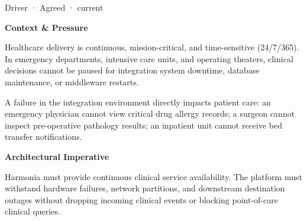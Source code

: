 \label{element:80e2d5f142da4dae8b7bb70e9ddcab06}
{\small Driver · Agreed · current}\par

\par\medskip\textbf{Context \& Pressure}\par


Healthcare delivery is continuous, mission-critical, and time-sensitive (24/7/365). In emergency departments, intensive care units, and operating theaters, clinical decisions cannot be paused for integration system downtime, database maintenance, or middleware restarts.



A failure in the integration environment directly impacts patient care: an emergency physician cannot view critical drug allergy records; a surgeon cannot inspect pre-operative pathology results; an inpatient unit cannot receive bed transfer notifications.



\par\medskip\textbf{Architectural Imperative}\par


Harmonia must provide continuous clinical service availability. The platform must withstand hardware failures, network partitions, and downstream destination outages without dropping incoming clinical events or blocking point-of-care clinical queries.



